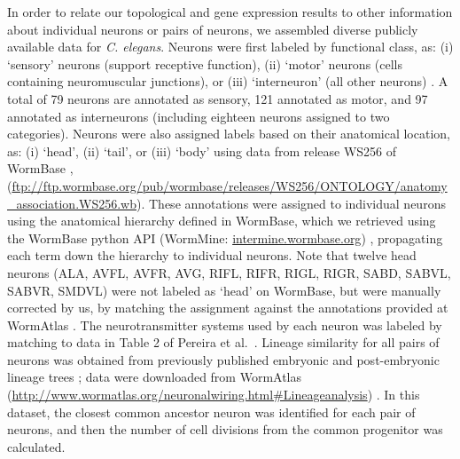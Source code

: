 \documentclass[10pt,letterpaper]{article}
\begin{document}
In order to relate our topological and gene expression results to other information about individual neurons or pairs of neurons, we assembled diverse publicly available data for \emph{C. elegans}.
Neurons were first labeled by functional class, as:
(i) `sensory' neurons (support receptive function),
(ii) `motor' neurons (cells containing neuromuscular junctions), or
(iii) `interneuron' (all other neurons) \cite{White:1986tx}.
A total of 79 neurons are annotated as sensory, 121 annotated as motor, and 97 annotated as interneurons (including eighteen neurons assigned to two categories).
Neurons were also assigned labels based on their anatomical location, as:
(i) `head', (ii) `tail', or (iii) `body' using data from release WS256 of WormBase \cite{Harris:2009kd}, (\url{ftp://ftp.wormbase.org/pub/wormbase/releases/WS256/ONTOLOGY/anatomy_association.WS256.wb}).
These annotations were assigned to individual neurons using the anatomical hierarchy defined in WormBase, which we retrieved using the WormBase python API (WormMine: \url{intermine.wormbase.org}) \cite{Harris:2009kd}, propagating each term down the hierarchy to individual neurons.
Note that twelve head neurons (ALA, AVFL, AVFR, AVG, RIFL, RIFR, RIGL, RIGR, SABD, SABVL, SABVR, SMDVL) were not labeled as `head' on WormBase, but were manually corrected by us, by matching the assignment against the annotations provided at WormAtlas \cite{WormAtlas}.
The neurotransmitter systems used by each neuron was labeled by matching to data in Table 2 of Pereira et al.~\cite{Pereira:2015er}.
Lineage similarity for all pairs of neurons was obtained from previously published embryonic and post-embryonic lineage trees \cite{Sulston1977, Sulston1983}; data were downloaded from WormAtlas (\url{http://www.wormatlas.org/neuronalwiring.html#Lineageanalysis}) \cite{WormAtlas}.
In this dataset, the closest common ancestor neuron was identified for each pair of neurons, and then the number of cell divisions from the common progenitor was calculated.
\end{document}
